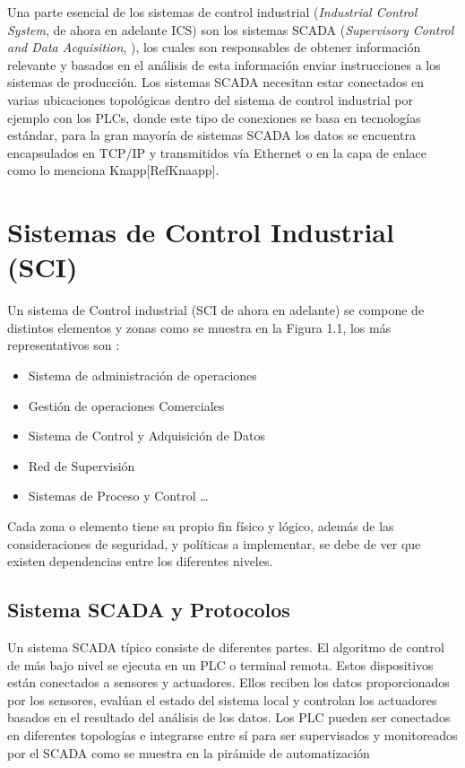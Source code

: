 \documentclass[jou]{apa6}   %
\begin{document}
Una parte esencial de los sistemas de control industrial (\textit{Industrial Control System}, de ahora en adelante ICS) son los sistemas SCADA (\textit{Supervisory Control and Data Acquisition}, ), los cuales son responsables de obtener información relevante y basados en el análisis de esta información enviar instrucciones a los sistemas de producción. Los sistemas SCADA necesitan estar conectados en varias ubicaciones topológicas dentro del sistema de control industrial por ejemplo con los PLCs, donde este tipo de conexiones se basa en tecnologías estándar, para la gran mayoría de sistemas SCADA los datos se encuentra encapsulados en TCP/IP y transmitidos vía Ethernet o en la capa de enlace como lo menciona Knapp[RefKnaapp]. 

\section{Sistemas de Control Industrial (SCI)}
Un sistema de Control industrial (SCI de ahora en adelante) se compone de distintos elementos  y zonas como se muestra en la Figura 1.1, los más representativos son :
\begin{itemize}
  \item Sistema de administración de  operaciones
  \item Gestión de operaciones Comerciales
  \item Sistema de Control y Adquisición de Datos
  \item Red de Supervisión
  \item Sistemas de Proceso y Control \ldots
\end{itemize}
Cada zona o elemento tiene su propio fin físico y lógico, además de las consideraciones de seguridad, y políticas a implementar, se debe de ver que  existen dependencias entre los diferentes niveles. 

\subsection{Sistema SCADA y Protocolos }
Un sistema SCADA típico consiste de diferentes partes. El algoritmo de control de más bajo nivel se ejecuta en un PLC o terminal remota. Estos dispositivos están conectados a sensores y actuadores. Ellos reciben los datos proporcionados por los sensores, evalúan el estado del sistema local  y controlan los actuadores basados en el resultado del análisis de los datos. Los PLC pueden ser conectados en diferentes topologías e integrarse entre sí para ser supervisados y monitoreados por el SCADA como se muestra en la pirámide de automatización 
\end{document}
